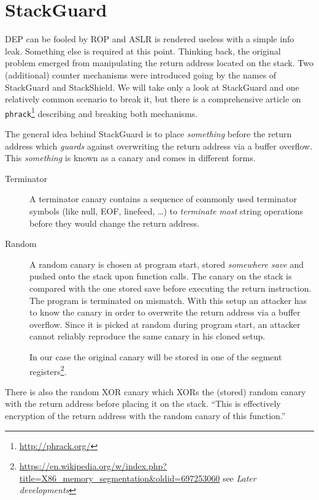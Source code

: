 \documentclass[article]{uibk}
\begin{document}
\section{StackGuard}

DEP can be fooled by ROP and ASLR is rendered useless with a simple info leak.
Something else is required at this point. Thinking back, the original problem
emerged from manipulating the return address located on the stack. Two
(additional) counter mechanisms were introduced going by the names of
StackGuard and StackShield. We will take only a look at StackGuard and one
relatively common scenario to break it, but there is a comprehensive article
\cite{phrack_stack_guard} on \texttt{phrack}\footnote{\url{http://phrack.org/}}
describing and breaking both mechanisms.

The general idea behind StackGuard is to place \emph{something} before the
return address which \emph{guards} against overwriting the return address via a
buffer overflow. This \emph{something} is known as a canary and comes in
different forms.

\begin{description}
    \item[Terminator] A terminator canary contains a sequence of commonly used
        terminator symbols (like null, EOF, linefeed, \dots) to
        \emph{terminate} \emph{most} string operations before they would change
        the return address.

    \item[Random] A random canary is chosen at program start, stored
        \textit{somewhere save} and pushed onto the stack upon function calls.
        The canary on the stack is compared with the one stored save before
        executing the return instruction. The program is terminated on
        mismatch. With this setup an attacker has to know the canary in order
        to overwrite the return address via a buffer overflow. Since it is
        picked at random during program start, an attacker cannot reliably
        reproduce the same canary in his cloned setup.

        In our case the original canary will be stored in one of the segment
        registers\footnote{\url{https://en.wikipedia.org/w/index.php?title=X86_memory_segmentation&oldid=697253060}
        see \textit{Later developments}}.
\end{description}

There is also the random XOR canary which XORs the (stored) random canary with
the return address before placing it on the stack. ``This is effectively
encryption of the return address with the random canary of this
function.''~\cite{phrack_stack_guard}
\end{document}
